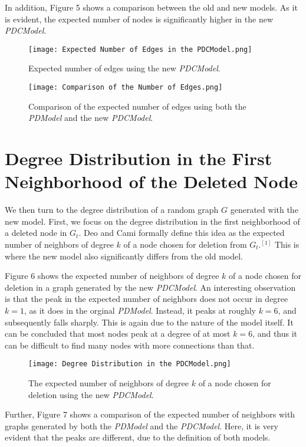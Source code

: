 \documentclass[final,3p,times,twocolumn]{elsarticle}
\begin{document}
In addition, Figure 5 shows a comparison between the old and new models. As it is evident, the expected number of nodes is significantly higher in the new \textit{PDCModel}.

\begin{figure}[h]
\centering
\texttt{[image: Expected Number of Edges in the PDCModel.png]}
\caption{Expected number of edges using the new \textit{PDCModel}.}
\end{figure}

\begin{figure}[h]
\centering
\texttt{[image: Comparison of the Number of Edges.png]}
\caption{Comparison of the expected number of edges using both the \textit{PDModel} and the new \textit{PDCModel}.}
\end{figure}

\section{Degree Distribution in the First Neighborhood of the Deleted Node}
\label{S:7}

We then turn to the degree distribution of a random graph $G$ generated with the new model. First, we focus on the degree distribution in the first neighborhood of a deleted node in $G_t$. Deo and Cami formally define this idea as the expected number of neighbors of degree $k$ of a node chosen for deletion from $G_t$.$^{[1]}$ This is where the new model also significantly differs from the old model.

Figure 6 shows the expected number of neighbors of degree $k$ of a node chosen for deletion in a graph generated by the new \textit{PDCModel}. An interesting observation is that the peak in the expected number of neighbors does not occur in degree $k = 1$, as it does in the orginal \textit{PDModel}. Instead, it peaks at roughly $k = 6$, and subsequently falls sharply. This is again due to the nature of the model itself. It can be concluded that most nodes peak at a degree of at most $k = 6$, and thus it can be difficult to find many nodes with more connections than that.

\begin{figure}[h]
\centering\texttt{[image: Degree Distribution in the PDCModel.png]}
\caption{The expected number of neighbors of degree $k$ of a node chosen for deletion using the new \textit{PDCModel}.}
\end{figure}

Further, Figure 7 shows a comparison of the expected number of neighbors with graphs generated by both the \textit{PDModel} and the \textit{PDCModel}. Here, it is very evident that the peaks are different, due to the definition of both models.
\end{document}
